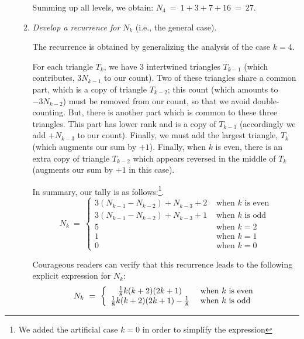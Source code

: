 \begin{itemize}
\begin{enumerate}
\smallskip

Summing up all levels, we obtain:  $N_4 \ = \ 1 + 3 + 7 + 16 \ = \ 27$.

\medskip\item
{\em Develop a recurrence for} $N_k$ (i.e., the general case).

\smallskip

The recurrence is obtained by generalizing the analysis of the case $k=4$.

\smallskip

For each triangle $T_k$, we have $3$ intertwined triangles $T_{k-1}$ (which contributes, $3 N_{k-1}$ to our count).  Two of these triangles share a common part, which is a copy of triangle $T_{k-2}$; this count (which amounts to $ -3 N_{k-2}$) must be removed from our count, so that we avoid double-counting.  But, there is another part which is common to these three triangles. This part has lower rank and is a copy of $T_{k-3}$ (accordingly we add $+ N_{k-3}$ to our count).  Finally, we must add the largest triangle, $T_{k}$ (which augments our sum by $+1$).  Finally, when $k$ is even,  there is an extra copy of triangle $T_{k-2}$ which appears reversed in the middle of $T_k$ (augments our sum by $+1$ in this case).

\smallskip

In summary, our tally is as follows:\footnote{We added the artificial case $k=0$ in order to simplify the expression}.
\[ N_k \ = \ \left\{
\begin{array}{cl}
3 (N_{k-1} - N_{k-2}) + N_{k-3} + 2 & \mbox{ when $k$ is even} \\
3 (N_{k-1} - N_{k-2}) + N_{k-3} + 1 & \mbox{ when $k$ is odd} \\
5 & \mbox{ when $k=2$} \\
1 & \mbox{ when $k=1$} \\
0 & \mbox{ when $k=0$}
\end{array}
\right. \] 


\medskip

Courageous readers can verify that this recurrence leads to the following explicit expression for $N_k$:
\[ N_k \ = \ \left\{
\begin{array}{cl}
{1 \over 8} k(k+2)(2k+1) & \mbox{ when $k$ is even} \\ 
{1 \over 8} k(k+2)(2k+1)-{1 \over 8}  & \mbox{ when $k$ is odd}
\end{array}
\right. \]
\end{enumerate}


\end{itemize}
